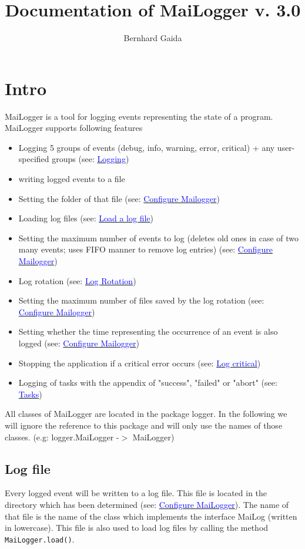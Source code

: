 \documentclass{article}
\title{Documentation of MaiLogger v. 3.0}
\author{Bernhard Gaida}
\newcommand{\refh}[2]{\hyperref[#1] {\textcolor{blue}{#2}}}
\newcommand{\coB}[1]{\textcolor{blue}{#1}}
\begin{document}
\maketitle
\tableofcontents
\pagebreak

\section{Intro}
\label{intro}
    MaiLogger is a tool for logging events representing the state of a program.
    MaiLogger supports following features
    \begin{itemize}
        \item Logging 5 groups of events (debug, info, warning, error, critical) + any user-specified groups (see: \refh{logging}{Logging})
        \item writing logged events to a file
        \item Setting the folder of that file (see: \hyperref[setup_mailogger.setup]{\coB{Configure Mailogger}})
        \item Loading log files (see: \refh{other_load}{Load a log file})
        \item Setting the maximum number of events to log (deletes old ones in case of two many events; uses FIFO manner to remove log entries) (see: \refh{setup_mailogger.setup}{Configure Mailogger})
        \item Log rotation (see: \refh{rotate}{Log Rotation})
        \item Setting the maximum number of files saved by the log rotation (see: \refh{setup_mailogger.setup}{Configure Mailogger})
        \item Setting whether the time representing the occurrence of an event is also logged (see: \refh{setup_mailogger.setup}{Configure Mailogger})
        \item Stopping the application if a critical error occurs (see: \refh{logging_critical}{Log critical})
        \item Logging of tasks with the appendix of "success", "failed" or "abort" (see: \refh{tasks}{Tasks})
    \end{itemize}
    All classes of MaiLogger are located in the package logger.
    In the following we will ignore the reference to this package and will only use the names of those classes. (e.g: logger.MaiLogger -$>$ MaiLogger)

    \subsection{Log file}
    Every logged event will be written to a log file.
    This file is located in the directory which has been determined (see: \refh{setup_mailogger.setup}{Configure MaiLogger}).
    The name of that file is the name of the class which implements the interface MaiLog (written in lowercase).
    This file is also used to load log files by calling the method \lstinline|MaiLogger.load()|.
\end{document}
